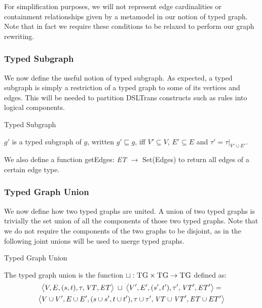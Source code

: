 For simplification purposes, we will not represent edge cardinalities or containment relationships given by a metamodel in our notion of typed graph. Note that in fact we require these conditions to be relaxed to perform our graph rewriting.



\subsubsection*{Typed Subgraph}
We now define the useful notion of typed subgraph. As expected, a typed subgraph is simply a restriction of a typed graph to some of its vertices and edges. This will be needed to partition DSLTrans constructs such as rules into logical components.

\begin{definition}{Typed Subgraph\\}
\label{def:typedsubgraph}

$g'$ is a typed subgraph of $g$, written $g'\sqsubseteq g$, iff $V'\subseteq V$, $E'\subseteq E$ and $\tau'=\tau |_{V'\cup E'}$.

\end{definition}


We also define a function getEdges: \textit{ET} $\rightarrow$ Set(Edges) to return all edges of a certain edge type.

\subsubsection*{Typed Graph Union}
We now define how two typed graphs are united. A union of two typed graphs is trivially the set union of all the components of those two typed graphs. Note that we do not require the components of the two graphs to be disjoint, as in the following joint unions will be used to merge typed graphs.

\begin{definition}{Typed Graph Union\\}
\label{def:typed_graph_union}

The typed graph union is the function $\sqcup :\textsc{TG}\times \textsc{TG}\rightarrow \textsc{TG}$ defined as:
\begin{multline*}
\big\langle V,E,(s,t),\tau,\mathit{VT},\mathit{ET}\big\rangle\;\sqcup\;\big\langle V',E',(s',t'),\tau',\mathit{VT}',\mathit{ET}'\big\rangle=\\
\big\langle V\cup V', E\cup E',(s\cup s', t\cup t'), \tau\cup \tau', \mathit{VT}\cup \mathit{VT}', \mathit{ET}\cup ET'\big\rangle
\end{multline*}
\end{definition}

